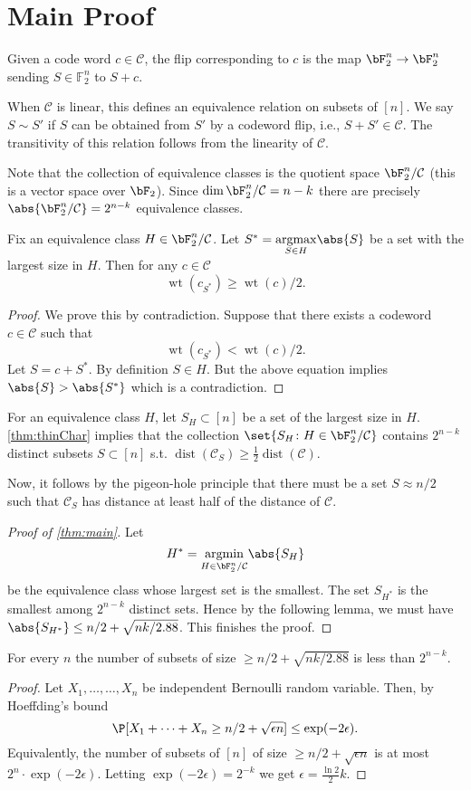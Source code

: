 \documentclass[12pt]{article}
\def\C{\mathcal{C}}
\DeclareMathOperator{\wt}{wt}
\DeclareMathOperator{\dist}{dist}
\DeclareMathOperator{\amin}{argmin}
\DeclareMathOperator{\amax}{argmax}
\def\eps{\epsilon}
\newcommand{\cd}{k} %
\begin{document}
\section{Main Proof}
\begin{defn}
Given a code word $c\in \C$, the flip corresponding to $c$ is the map $\bF_2^n\to \bF_2^n$ sending $S\in \mathbb{F}_2^n$ to $S+c$. 

When $\C$ is linear, this defines an equivalence relation on subsets of $[n]$. We say $S \sim S'$ if $S$ can be obtained from $S'$ by a codeword flip, i.e., 
$S + S' \in \C$. The transitivity of this relation follows from the linearity of $\C$. 
\end{defn}

Note that the collection of equivalence classes is the quotient space $\bF_2^n/\C$ (this is a vector space over $\bF_2$). Since $\dim \bF_2^n/\C = n - \cd$ there are precisely $\abs{\bF_2^n/\C}=2^{n-\cd}$ equivalence classes. 

\begin{lemma}
    \label{thm:thinChar}
    Fix an equivalence class $H \in \bF_2^n/\C$. Let $S^*=\underset{S\in H}{\amax} \abs{S}$ 
    be a set with the largest size in $H$. Then for any $c\in \C$
    $$ \wt(c_{S^*})\geq \wt(c)/2.$$
\end{lemma}
\begin{proof}
    We prove this by contradiction. Suppose that there exists a codeword $c\in \C$ such that 
    $$ \wt(c_{S^*}) < \wt(c)/2.$$
    Let $S =c+S^*$. By definition $S\in H$. But the above equation implies $\abs{S}>\abs{S^*}$ which is a contradiction.   
\end{proof}
For an equivalence class $H$, let $S_H \subset [n]$ be a set of the largest size in $H$.
\cref{thm:thinChar} implies that the collection $\set{S_H \colon H \in \bF_2^n/\C}$ contains $2^{n-\cd}$ distinct subsets $S \subset [n]$ s.t. $\dist(\C_S) \geq \frac12\dist(\C)$.

Now, it follows by the pigeon-hole principle that there must be a set $S\approx n/2$ such that $\C_S$ has distance at least half of the distance of $\C$.
\begin{proof}[Proof of  \cref{thm:main}]
Let 
$$ H^* =\underset{H \in \bF_2^n/\C}{\amin} \abs{S_H}$$
be the equivalence class whose largest set is the smallest. The set $S_{H^*}$ is the smallest among $2^{n-\cd}$ distinct sets. 
Hence by the following  lemma,  we must have $\abs{S_{H^*}}\leq n/2+\sqrt{n\cd/2.88}$. This finishes the proof. 
\end{proof}
\begin{lemma}
    For every $n$ the number of subsets of size $\geq n/2+\sqrt{n\cd/2.88}$ is less than $2^{n-\cd}$.
\end{lemma}
\begin{proof}
Let $X_1,\dots,\dots,X_n$ be independent Bernoulli random variable. Then, by Hoeffding's bound 
$$\P[X_1+\dots+X_n \geq n/2+\sqrt{\eps n}]\leq \exp(-2\eps).$$
Equivalently, the number of subsets of $[n]$ of size $\geq n/2+\sqrt{\eps n}$ is at most $2^n\cdot \exp(-2\eps)$. Letting $\exp(-2\eps)=2^{-\cd}$ we get $\eps=\frac{\ln 2}{2}\cd$.
\end{proof}

\printbibliography
\end{document}

